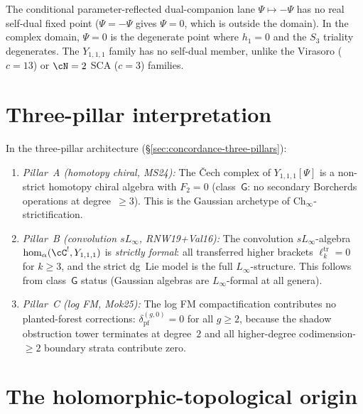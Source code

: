 \begin{remark}%
\label{rem:y111-self-dual}
The conditional parameter-reflected dual-companion lane
\(\Psi \mapsto -\Psi\) has no real self-dual fixed point
($\Psi = -\Psi$ gives $\Psi = 0$, which is
outside the domain). In the complex domain,
$\Psi = 0$ is the degenerate point where $h_1 = 0$ and
the $S_3$ triality degenerates. The $Y_{1,1,1}$ family has
no self-dual member, unlike the Virasoro ($c = 13$) or
$\cN = 2$ SCA ($c = 3$) families.
\end{remark}


\section{Three-pillar interpretation}%
\label{sec:y-three-pillar}

\begin{remark}%
\label{rem:y111-three-pillar}
In the three-pillar architecture
(\S\ref{sec:concordance-three-pillars}):
\begin{enumerate}[label=\textup{(\roman*)}]
\item \emph{Pillar~A (homotopy chiral, MS24):}
 The \v{C}ech complex of $Y_{1,1,1}[\Psi]$ is a non-strict
 homotopy chiral algebra with $F_2 = 0$ (class~$\mathsf{G}$:
 no secondary Borcherds operations at degree~$\geq 3$). This
 is the Gaussian archetype of Ch$_\infty$-strictification.
\item \emph{Pillar~B (convolution $sL_\infty$, RNW19+Val16):}
 The convolution $sL_\infty$-algebra
 $\operatorname{hom}_\alpha(\cC^!, Y_{1,1,1})$
 is \emph{strictly formal}: all transferred higher brackets
 $\ell_k^{\mathrm{tr}} = 0$ for $k \geq 3$, and the strict dg~Lie
 model is the full $L_\infty$-structure. This follows from
 class~$\mathsf{G}$ status (Gaussian algebras are $L_\infty$-formal
 at all genera).
\item \emph{Pillar~C (log FM, Mok25):}
 The log FM compactification contributes no planted-forest
 corrections: $\delta_{\mathrm{pf}}^{(g,0)} = 0$ for all
 $g \geq 2$, because the shadow obstruction tower terminates
 at degree~$2$ and all higher-degree codimension-${\geq}2$
 boundary strata contribute zero.
\end{enumerate}
\end{remark}


\section{The holomorphic-topological origin}%
\label{sec:y-ht-origin}

